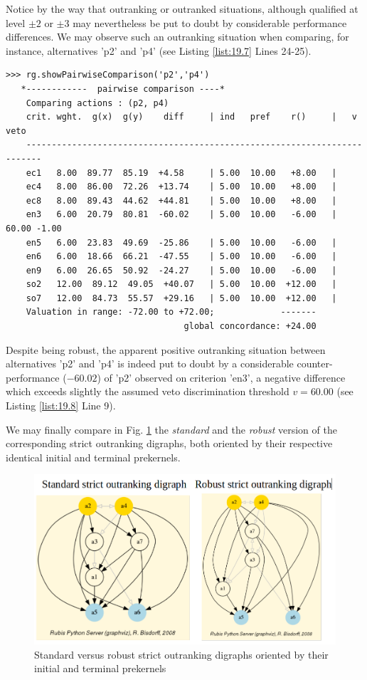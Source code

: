 Notice by the way that outranking or outranked situations, although qualified at level $\pm 2$ or $\pm 3$ may nevertheless be put to doubt by considerable performance differences. We may observe such an outranking situation when comparing, for instance, alternatives 'p2' and 'p4' (see Listing \ref{list:19.7} Lines 24-25).
\begin{lstlisting}[caption={Comparing alternatives 'p2' and 'p4'},label=list:19.8,basicstyle=\scriptsize]
>>> rg.showPairwiseComparison('p2','p4')
   *------------  pairwise comparison ----*
    Comparing actions : (p2, p4)
    crit. wght.  g(x)  g(y)    diff  	| ind   pref    r() 	|   v    veto
    -------------------------------------------------------------------------
    ec1   8.00  89.77  85.19  +4.58 	| 5.00  10.00   +8.00 	| 
    ec4   8.00  86.00  72.26  +13.74 	| 5.00  10.00   +8.00 	| 
    ec8   8.00  89.43  44.62  +44.81 	| 5.00  10.00   +8.00 	| 
    en3   6.00  20.79  80.81  -60.02 	| 5.00  10.00   -6.00 	| 60.00 -1.00
    en5   6.00  23.83  49.69  -25.86 	| 5.00  10.00   -6.00 	| 
    en6   6.00  18.66  66.21  -47.55 	| 5.00  10.00   -6.00 	| 
    en9   6.00  26.65  50.92  -24.27 	| 5.00  10.00   -6.00 	| 
    so2   12.00  89.12  49.05  +40.07 	| 5.00  10.00  +12.00 	| 
    so7   12.00  84.73  55.57  +29.16 	| 5.00  10.00  +12.00   |
    Valuation in range: -72.00 to +72.00;             -------
                                   global concordance: +24.00      
\end{lstlisting}
Despite being robust, the apparent positive outranking situation between alternatives 'p2' and 'p4' is indeed put to doubt by a considerable counter-performance ($-60.02$) of 'p2' observed on criterion 'en3', a negative difference which exceeds slightly the assumed veto discrimination threshold $v = 60.00$ (see Listing \ref{list:19.8} Line 9).

We may finally compare in Fig. \ref{fig:19.1} the \emph{standard} and the \emph{robust} version of the corresponding strict outranking digraphs, both oriented by their respective identical initial and terminal prekernels.
\begin{figure}[h]
\includegraphics[width=12cm]{Figures/robStdStrictOutranking.png}
\caption{Standard versus robust strict outranking digraphs oriented by their initial and terminal prekernels} 
\label{fig:19.1}       %
\end{figure}
   
